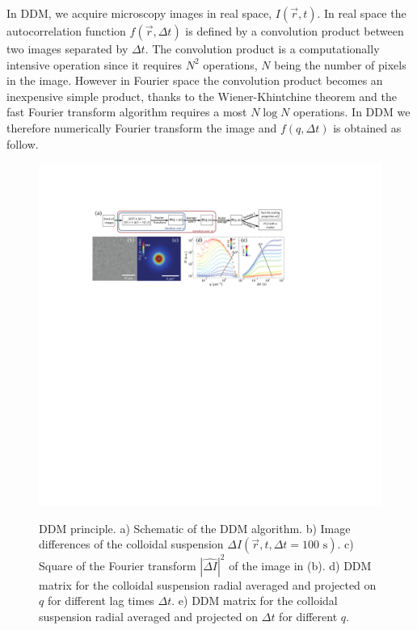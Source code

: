 \documentclass[%
 aip,
 jmp,%
 amsmath,amssymb,
reprint,%
]{revtex4-1}
\newcommand{\tg}[1]{{\color{magenta}#1}} %
\begin{document}
\tg{In DDM, we acquire microscopy images in real space, $I(\vec{r}, t)$. In real space the autocorrelation function $f(\vec{r}, \Delta t)$ is defined by a convolution product between two images separated by $\Delta t$. The convolution product is a computationally intensive operation since it requires $N^2$ operations, $N$ being the number of pixels in the image. However in Fourier space the convolution product becomes an inexpensive simple product, thanks to the Wiener-Khintchine theorem and the fast Fourier transform algorithm requires a most $N\log N$ operations}. In DDM  we therefore numerically Fourier transform the image and $f(q, \Delta t)$ is obtained as follow.

\begin{figure}
	\includegraphics[width=\linewidth]{Graph.pdf}\\
	\caption{\tg{DDM principle. a) Schematic of the DDM algorithm. b) Image differences of the colloidal suspension $\Delta I(\vec{r}, t,\Delta t=100 \text{ s})$. c) Square of the Fourier transform $|\widehat{\Delta I}|^2$ of the image in  (b). d) DDM matrix for the colloidal suspension radial averaged and projected on $q$ for different lag times $\Delta t$. e) DDM matrix for the colloidal suspension radial averaged and projected on $\Delta t$ for different $q$.}}
	\label{D}
\end{figure}
\end{document}

